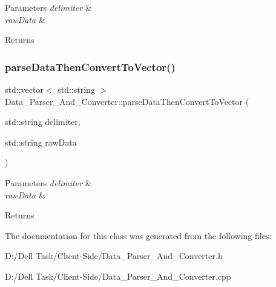 \begin{DoxyParams}{Parameters}
{\em delimiter} & \\
\hline
{\em raw\+Data} & \\
\hline
\end{DoxyParams}
\begin{DoxyReturn}{Returns}

\end{DoxyReturn}
\mbox{\label{class_data___parser___and___converter_aba2bbb38e79306b1da28ec1042e2b888}} 
\subsubsection{\texorpdfstring{parse\+Data\+Then\+Convert\+To\+Vector()}{parseDataThenConvertToVector()}}
{\footnotesize\ttfamily std\+::vector$<$ std\+::string $>$ Data\+\_\+\+Parser\+\_\+\+And\+\_\+\+Converter\+::parse\+Data\+Then\+Convert\+To\+Vector (\begin{DoxyParamCaption}\item[{std\+::string}]{delimiter,  }\item[{std\+::string}]{raw\+Data }\end{DoxyParamCaption})\hspace{0.3cm}{\ttfamily [static]}}






\begin{DoxyParams}{Parameters}
{\em delimiter} & \\
\hline
{\em raw\+Data} & \\
\hline
\end{DoxyParams}
\begin{DoxyReturn}{Returns}

\end{DoxyReturn}


The documentation for this class was generated from the following files\+:\begin{DoxyCompactItemize}
\item 
D\+:/\+Dell Task/\+Client-\/\+Side/Data\+\_\+\+Parser\+\_\+\+And\+\_\+\+Converter.\+h\item 
D\+:/\+Dell Task/\+Client-\/\+Side/Data\+\_\+\+Parser\+\_\+\+And\+\_\+\+Converter.\+cpp\end{DoxyCompactItemize}
